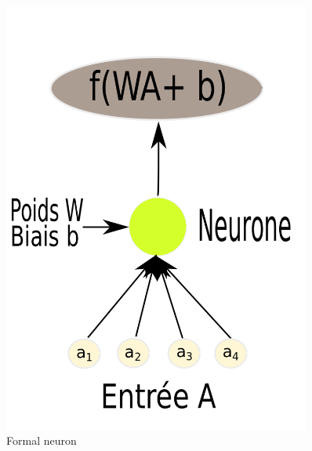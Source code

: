 \documentclass[conference]{IEEEtran}
\begin{document}
\begin{figure}[!tbp]
\centering  
  \begin{minipage}[b]{0.225\textwidth}
    \includegraphics[width=0.9\textwidth]{Neuron}
    \caption{Formal neuron}
  \end{minipage}
  \hfill
  \begin{minipage}[b]{0.225\textwidth}

\end{minipage}
\end{figure}
\end{document}
